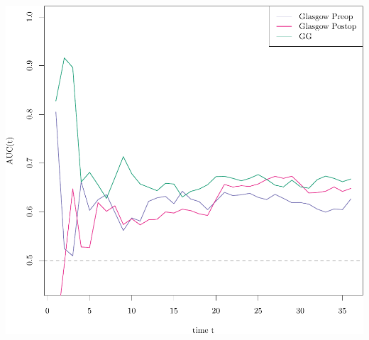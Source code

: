 \documentclass{article}\usepackage[]{graphicx}\usepackage[]{color}
\makeatletter
\def\maxwidth{ %
  \ifdim\Gin@nat@width>\linewidth
    \linewidth
  \else
    \Gin@nat@width
  \fi
}
\newenvironment{knitrout}{}{} %
\makeatother
\begin{document}
\begin{knitrout}
{\centering \includegraphics[width=\maxwidth]{figure/07-timeROC-glasgow-1} 

}



\end{knitrout}
\end{document}
